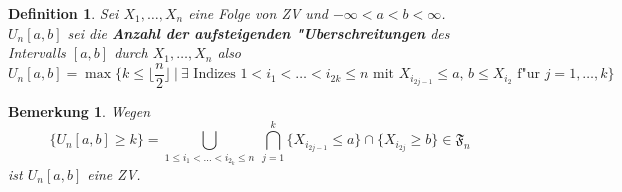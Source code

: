 \documentclass[a4paper,11pt]{scrbook}
\def\FF{ \mathfrak{F} }
\newtheorem{Def}{Definition}[chapter]
\newtheorem{Bem}{Bemerkung}[chapter]
\theoremstyle{nonumberplain}
\begin{document}
\begin{Def}
Sei $X_1,\dots,X_n$ eine Folge von ZV und $-\infty < a < b < \infty$.\\
$U_n[a,b]$ sei die \textbf{Anzahl der aufsteigenden "Uberschreitungen} des Intervalls $[a,b]$ durch $X_1,\dots,X_n$ also
\[
U_n[a,b] = \max\{ k \leq \lfloor \frac{n}2 \rfloor\ |\ \exists \text{ Indizes } 1 < i_1 < \dots < i_{2k} \leq n \text{ mit } X_{i_{2j-1}} \leq a,\, b \leq X_{i_2} \text{ f"ur } j = 1,\dots,k \}
\]
\end{Def}

\begin{Bem}
Wegen
\[
\{U_n[a,b] \geq k\} = \bigcup_{1\leq i_1<\dots<i_{2_k}\leq n} \ \bigcap_{j=1}^k \{ X_{i_{2j-1}} \leq a \} \cap \{X_{i_{2j}} \geq b\} \in \FF_n
\]
ist $U_n[a,b]$ eine ZV.
\end{Bem}
\end{document}
